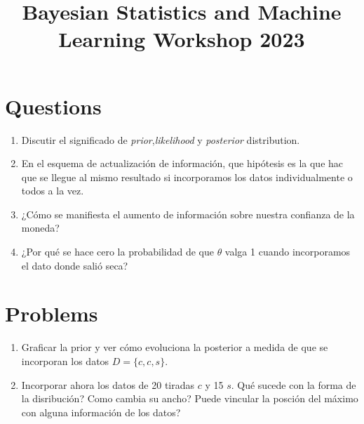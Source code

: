 \documentclass[12pt]{paper}
\title{\begin{center}Bayesian Statistics and Machine Learning Workshop 2023\end{center}}
\subtitle{\begin{center}\Large Prior, Likelihood and Posterior Distribution\\ Martín Onetto \end{center}}
\begin{document}
\maketitle


\topmargin -2.0cm
\oddsidemargin -0.2cm
\evensidemargin -0.2cm

\vspace{-80pt}

\section{Questions}

\begin{enumerate}
\item Discutir el significado de \textit{prior},\textit{likelihood} y \textit{posterior} distribution.
\item En el esquema de actualización de información, que hipótesis es la que hac que se llegue al mismo resultado si incorporamos los datos individualmente o todos a la vez.
\item ¿Cómo se manifiesta el aumento de información sobre nuestra confianza de la moneda? 
\item ¿Por qué se hace cero la probabilidad de que $\theta$ valga 1 cuando incorporamos el dato donde salió seca?
\end{enumerate}
\section{Problems}

\begin{enumerate}
\item Graficar la prior y ver cómo evoluciona la posterior a medida de que se incorporan los datos $ D = \{c,c,s\}$.

\item Incorporar ahora los datos de 20 tiradas $c$ y  15 $s$. Qué sucede con la forma de la disribución? Como cambia su ancho? Puede vincular la posción del máximo con alguna información de los datos?

\end{enumerate}

\pagestyle{empty}
\end{document}
